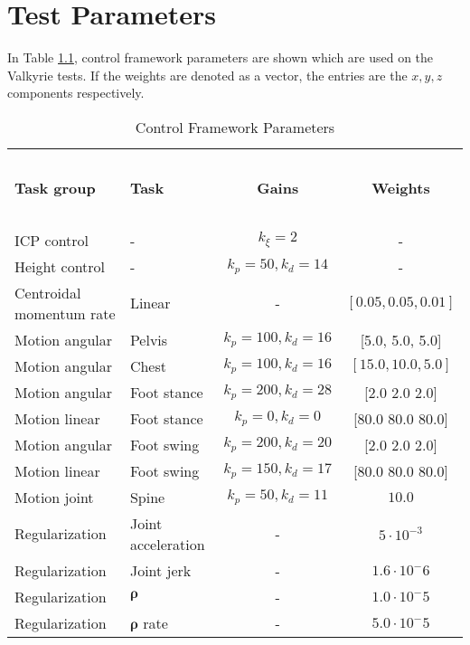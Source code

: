 %
\chapter{Test Parameters}\label{chap:params}
In Table \ref{tab:params}, control framework parameters are shown which are used on the Valkyrie tests.  If the weights are denoted as a vector, the entries are the $x,y,z$ components respectively.

\begin{table}[h]
\caption{Control Framework Parameters}
\label{tab:params}
\begin{center}
\begin{tabular}{llcc}
\hline~\\[-2ex]
\textbf{Task group} & \textbf{Task} & \textbf{Gains} & \textbf{Weights}\\
\hline ~\\[-2ex]
ICP control & - & $k_{\xi}=2$ & - \\
Height control & - & $k_p=50, k_d=14$ & - \\
Centroidal momentum rate & Linear & - & $[0.05, 0.05, 0.01]$ \\
Motion angular & Pelvis & $k_p=100, k_d=16$ & [5.0, 5.0, 5.0]\\
Motion angular & Chest & $k_p=100, k_d=16$ & $[15.0, 10.0, 5.0]$\\
Motion angular & Foot stance & $k_p=200, k_d=28$ &  [2.0 2.0 2.0]\\
Motion linear & Foot stance & $k_p=0, k_d=0$ & [80.0 80.0 80.0]\\
Motion angular & Foot swing & $k_p=200, k_d=20$ & [2.0 2.0 2.0]\\
Motion linear & Foot swing & $k_p=150, k_d=17$ & [80.0 80.0 80.0]\\
Motion joint& Spine & $k_p=50, k_d=11$ & $10.0$\\
Regularization & Joint acceleration & - & $5 \cdot 10^{-3}$\\
Regularization & Joint jerk & - & $1.6 \cdot 10^-{6}$\\
Regularization & $\boldsymbol{\rho}$ & - & $1.0 \cdot 10^-{5}$\\
Regularization & $\boldsymbol{\rho}$ rate & - & $5.0 \cdot 10^-{5}$\\
\hline
\end{tabular}
\end{center}
\end{table}